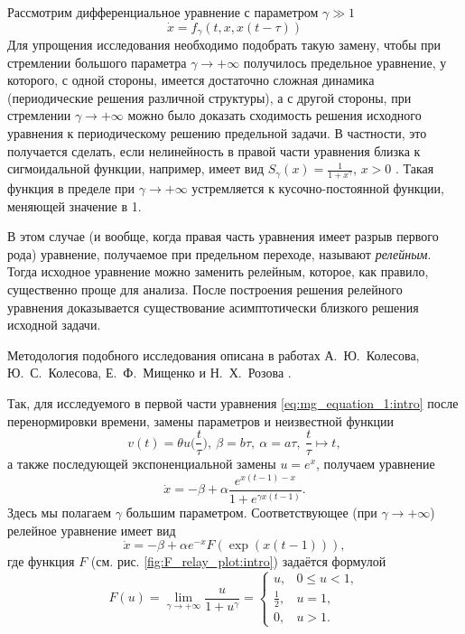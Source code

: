 Рассмотрим дифференциальное уравнение с параметром $\gamma \gg 1$
\[
\dot{x} = f_{\gamma}(t, x, x(t - \tau))
\]
Для упрощения исследования необходимо подобрать такую замену, чтобы при стремлении большого параметра $\gamma \to +\infty$ получилось предельное уравнение, у которого, с одной стороны, имеется достаточно сложная динамика (периодические решения различной структуры), а с другой стороны, при стремлении $\gamma \to +\infty$ можно было доказать сходимость решения исходного уравнения к периодическому решению предельной задачи. В частности, это получается сделать, если нелинейность в правой части уравнения близка к сигмоидальной функции, например, имеет вид $S_\gamma(x)=\frac{1}{1 + x^\gamma}$, $x > 0$ \cite{Preobrazhenskaya2020, Glyzin2017, Krisztin2020, Bartha2021}. Такая функция в пределе при $\gamma\to+\infty$ устремляется к кусочно-постоянной функции, меняющей значение в 1.

В этом случае (и вообще, когда правая часть уравнения имеет разрыв первого рода) уравнение, получаемое при предельном переходе, называют \emph{релейным}. Тогда исходное уравнение можно заменить релейным, которое, как правило, существенно проще для анализа. После построения решения релейного уравнения доказывается существование асимптотически близкого решения исходной задачи.

Методология подобного исследования описана в работах А.~Ю.~Колесова, Ю.~С.~Колесова, Е.~Ф.~Мищенко и Н.~Х.~Розова \cite{KolesovKolesov1993, Kolesov2010}.

Так, для исследуемого в первой части уравнения \eqref{eq:mg_equation_1:intro} после перенормировки времени, замены параметров и неизвестной функции 
\begin{equation}
	\label{eq:intro_substitutions_v}
	v(t) = \theta u\Big(\frac{t}{\tau}\Big),\ \beta = b\tau,\ \alpha=a\tau, \ \frac{t}{\tau} \mapsto t,
\end{equation}
а также последующей экспоненциальной замены $u = e^x$, получаем уравнение
\begin{equation}
	\label{eq:intro:MG_norm1}
	\dot{x}=-\beta+\alpha\frac{e^{x(t-1)-x}}{1+e^{\gamma x(t-1)}}.
\end{equation}
Здесь мы полагаем $\gamma$ большим параметром. Соответствующее (при $\gamma \to +\infty$) релейное уравнение имеет вид
\begin{equation}
	\label{eq:intro:MG_norm_relay}
	\dot{x}=-\beta + \alpha e^{-x} F(\exp({x(t-1)})),
\end{equation}
где функция $F$ (см. рис. \ref{fig:F_relay_plot:intro}) задаётся формулой
\begin{equation}
	\label{eq:intro:F_relay}
	F(u)=\lim\limits_{\gamma\to +\infty}\frac{u}{1+u^{\gamma}} = 
	\begin{cases}
		u, & 0 \leq u < 1,\\
		\frac{1}{2}, & u = 1,\\
		0, & u > 1.
	\end{cases}
\end{equation}

